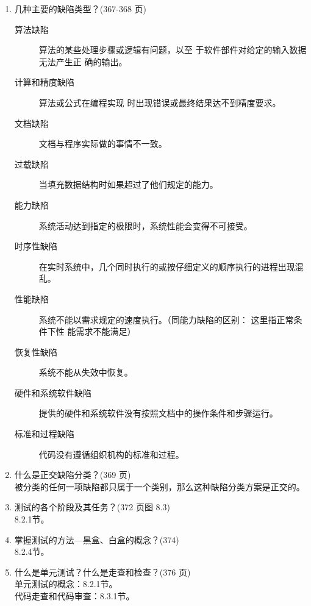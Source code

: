 \documentclass[14pt, letterpaper, UTF8, fontset=windowsnew, heading=true]{article}
\begin{document}
\begin{enumerate}

	\item 几种主要的缺陷类型？(367-368 页)
	\begin{description}
		\item[算法缺陷] 算法的某些处理步骤或逻辑有问题，以至
		于软件部件对给定的输入数据无法产生正
		确的输出。
		\item[计算和精度缺陷] 算法或公式在编程实现
		时出现错误或最终结果达不到精度要求。
		\item[文档缺陷] 文档与程序实际做的事情不一致。
		\item[过载缺陷] 当填充数据结构时如果超过了他们规定的能力。
		\item[能力缺陷] 系统活动达到指定的极限时，系统性能会变得不可接受。
		\item[时序性缺陷] 在实时系统中，几个同时执行的或按仔细定义的顺序执行的进程出现混乱。
		\item[性能缺陷] 系统不能以需求规定的速度执行。（同能力缺陷的区别：
		这里指正常条件下性
		能需求不能满足）
		\item[恢复性缺陷] 系统不能从失效中恢复。
		\item[硬件和系统软件缺陷] 提供的硬件和系统软件没有按照文档中的操作条件和步骤运行。
		\item[标准和过程缺陷] 代码没有遵循组织机构的标准和过程。
	\end{description}
	
	\item 什么是正交缺陷分类？(369 页) \\
	被分类的任何一项缺陷都只属于一个类别，那么这种缺陷分类方案是正交的。
	
	\item 测试的各个阶段及其任务？(372 页图 8.3) \\
	8.2.1节。	
	

	\item 掌握测试的方法---黑盒、白盒的概念？(374) \\
	8.2.4节。
	
	\item 什么是单元测试？什么是走查和检查？(376 页) \\
	单元测试的概念：8.2.1节。 \\
	代码走查和代码审查：8.3.1节。
	

\end{enumerate}
\end{document}
